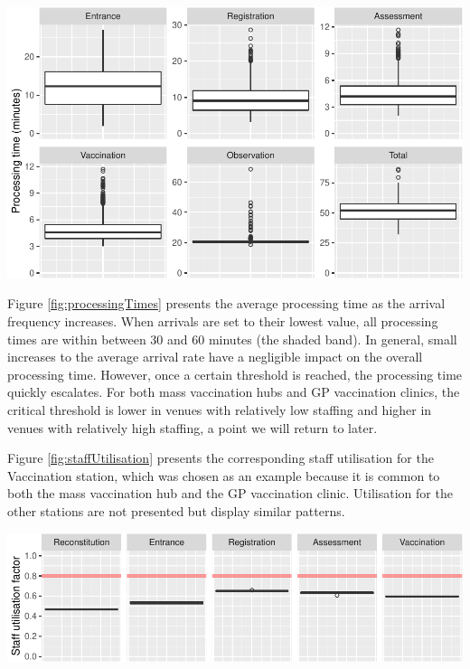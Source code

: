 \documentclass{article}
\let\origfigure\figure
\let\endorigfigure\endfigure
\renewenvironment{figure}[1][2] {
    \expandafter\origfigure\expandafter[H]
} {
    \endorigfigure
}
\begin{document}
\begin{figure}

{\centering \includegraphics{Preprint_files/figure-latex/processingTimes-1} 

}

\caption{Average processing times by arrival frequency for a mass vaccination hub (A) and a GP vaccination clinic (B)}\label{fig:processingTimes}
\end{figure}

Figure \ref{fig:processingTimes} presents the average processing time as
the arrival frequency increases. When arrivals are set to their lowest
value, all processing times are within between 30 and 60 minutes (the
shaded band). In general, small increases to the average arrival rate
have a negligible impact on the overall processing time. However, once a
certain threshold is reached, the processing time quickly escalates. For
both mass vaccination hubs and GP vaccination clinics, the critical
threshold is lower in venues with relatively low staffing and higher in
venues with relatively high staffing, a point we will return to later.

Figure \ref{fig:staffUtilisation} presents the corresponding staff
utilisation for the Vaccination station, which was chosen as an example
because it is common to both the mass vaccination hub and the GP
vaccination clinic. Utilisation for the other stations are not presented
but display similar patterns.

\begin{figure}

{\centering \includegraphics{Preprint_files/figure-latex/staffUtilisation-1} 

}

\caption{Average staff utilisation by arrival frequency for a mass vaccination hub (A) and a GP vaccination clinic (B)}\label{fig:staffUtilisation}
\end{figure}
\end{document}
